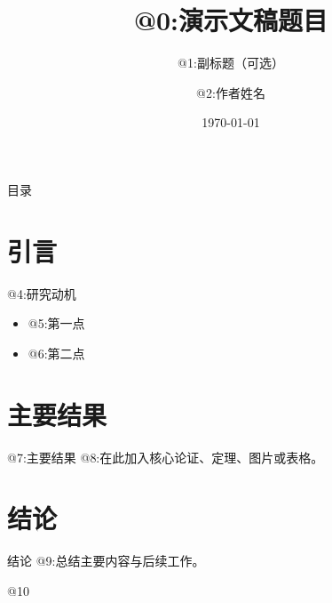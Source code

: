 \documentclass[UTF8,aspectratio=169]{ctexbeamer}
\title{@{0:演示文稿题目}}
\subtitle{@{1:副标题（可选）}}
\author{@{2:作者姓名}}
\institute{@{3:单位}}
\date{\today}
\theoremstyle{plain}
\theoremstyle{definition}
\theoremstyle{example}
\theoremstyle{remark}
\begin{document}
\begin{frame}
  \titlepage
\end{frame}

\begin{frame}{目录}
  \tableofcontents
\end{frame}

\section{引言}

\begin{frame}{@{4:研究动机}}
  \begin{itemize}
    \item @{5:第一点}
    \item @{6:第二点}
  \end{itemize}
\end{frame}

\section{主要结果}

\begin{frame}{@{7:主要结果}}
  @{8:在此加入核心论证、定理、图片或表格。}
\end{frame}

\section{结论}

\begin{frame}{结论}
  @{9:总结主要内容与后续工作。}
\end{frame}

@10
\end{document}
